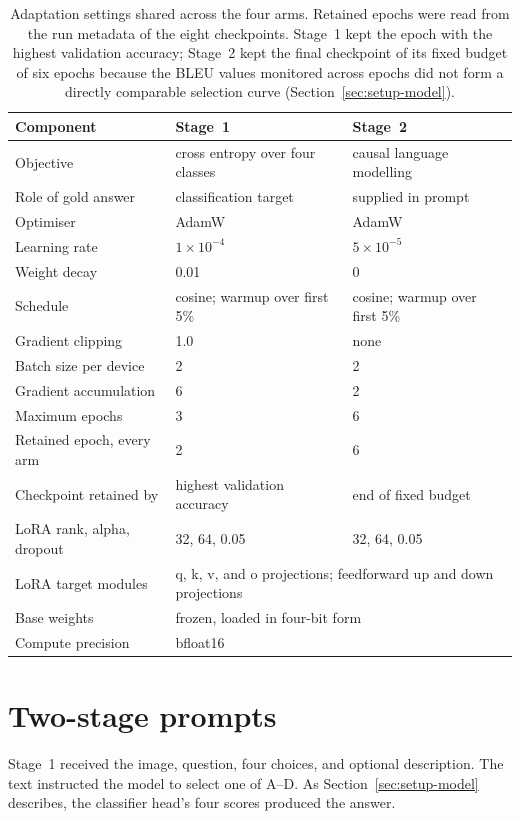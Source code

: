\begin{table}[ht]
\centering
\caption[Shared adaptation settings]{Adaptation settings shared across the four
arms. Retained epochs were read from the run metadata of the eight
checkpoints. Stage~1 kept the epoch with the
highest validation accuracy; Stage~2 kept the final checkpoint of its fixed budget
of six epochs because the BLEU values monitored across epochs did not form a
directly comparable selection curve (Section~\ref{sec:setup-model}).}
\label{tab:setup-training}
\begin{tabular}{lll}
\toprule
Component & Stage~1 & Stage~2 \\
\midrule
Objective & cross entropy over four classes & causal language modelling \\
Role of gold answer & classification target & supplied in prompt \\
Optimiser & AdamW & AdamW \\
Learning rate & $1\times10^{-4}$ & $5\times10^{-5}$ \\
Weight decay & 0.01 & 0 \\
Schedule & cosine; warmup over first 5\% & cosine; warmup over first 5\% \\
Gradient clipping & 1.0 & none \\
Batch size per device & 2 & 2 \\
Gradient accumulation & 6 & 2 \\
Maximum epochs & 3 & 6 \\
Retained epoch, every arm & 2 & 6 \\
Checkpoint retained by & highest validation accuracy & end of fixed budget \\
LoRA rank, alpha, dropout & 32, 64, 0.05 & 32, 64, 0.05 \\
LoRA target modules & \multicolumn{2}{l}{q, k, v, and o projections; feedforward up and down projections} \\
Base weights & \multicolumn{2}{l}{frozen, loaded in four-bit form} \\
Compute precision & \multicolumn{2}{l}{bfloat16} \\
\bottomrule
\end{tabular}
\end{table}

\section{Two-stage prompts}
\label{sec:setup-prompts}

Stage~1 received the image, question, four choices, and optional description.
The text instructed the model to select one of A--D. As
Section~\ref{sec:setup-model} describes, the classifier head's four scores produced
the answer.


